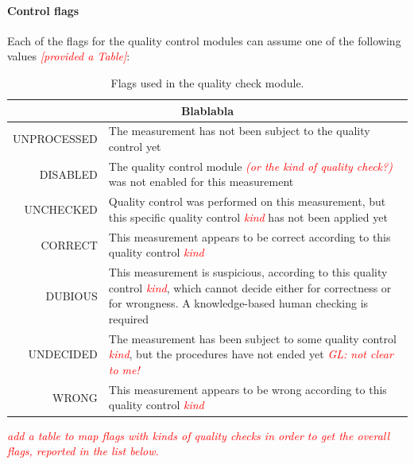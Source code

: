 \documentclass[authoryear,preprint,review,12pt]{elsarticle}
\newcommand{\note}[1]{\emph{\textcolor{red}{#1}}}
\begin{document}
\paragraph{Control flags}\label{controlFlags} %
Each of the flags for the quality control modules can assume one of the following values \note{[provided a Table]}:
\begin{table}[]
    \begin{scriptsize}
    \centering
    \begin{tabular}{r|p{10cm}}
    \multicolumn{2}{c}{Blablabla} \\
    \hline
	UNPROCESSED & The measurement has not been subject to the quality control yet\\
	DISABLED & The quality control module \note{(or the kind of quality check?)} was not enabled for this measurement\\
	UNCHECKED & Quality control was performed on this measurement, but this specific quality control \note{kind} has not been applied yet\\
	CORRECT & This measurement appears to be correct according to this quality control \note{kind} \\
	DUBIOUS & This measurement is suspicious, according to this quality control \note{kind}, which cannot decide either for correctness or for wrongness. A knowledge-based human checking is required \\
	UNDECIDED & The measurement has been subject to some quality control \note{kind}, but the procedures have not ended yet \note{GL: not clear to me!}\\
	WRONG & This measurement appears to be wrong according to this quality control \note{kind} \\
    \end{tabular}
    \caption{Flags used in the quality check module.}
    \label{tab:flagsSummary}
    \end{scriptsize}
\end{table}

\note{add a table to map flags with kinds of quality checks in order to get the overall flags, reported in the list below.}
\end{document}
